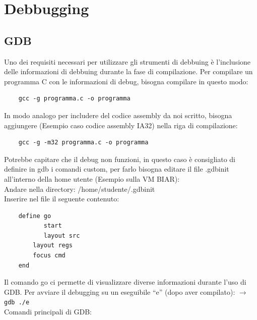 \chapter{Debbugging}

\section{GDB}
Uno dei requisiti necessari per utilizzare gli strumenti di debbuing è l’inclusione delle informazioni di debbuing durante la fase di compilazione. Per compilare un programma C con le informazioni di debug, bisogna compilare in questo modo:
\begin{verbatim}
    gcc -g programma.c -o programma
\end{verbatim}
In modo analogo per includere del codice assembly da noi scritto, bisogna aggiungere (Esempio caso codice assembly IA32) nella riga di compilazione:
\begin{verbatim}
    gcc -g -m32 programma.c -o programma
\end{verbatim}
Potrebbe capitare che il debug non funzioni, in questo caso è consigliato di definire in gdb i comandi custom, per farlo bisogna editare il file .gdbinit all’interno della home utente (Esempio sulla VM BIAR):
\\ Andare nella directory: /home/studente/.gdbinit\\ 
Inserire nel file il seguente contenuto:
\begin{verbatim}
    define go
    	   start
    	   layout src
        layout regs
        focus cmd
    end

\end{verbatim}
Il comando go ci permette di visualizzare diverse informazioni durante l’uso di GDB. Per avviare il debugging su un eseguibile “e” (dopo aver compilato): $\xrightarrow{}$  \verb|gdb ./e|
\\Comandi principali di GDB:
